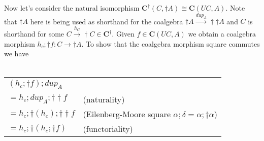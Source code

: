 \documentclass{article}
\newcommand{\mbf}{\mathbf}
\begin{document}
Now let's consider the natural isomorphism $\mbf{C}^\dagger(C,\dagger A) \cong \mbf{C}(UC,A)$. Note that
$\dagger A$ here is being used as shorthand for the coalgebra 
$\dagger A \overset{\mathit{dup}_A}{\longrightarrow} \dagger \dagger A$ and $C$ is shorthand for some $C \overset{h_C}{\longrightarrow} \dagger C \in \mathbf{C}^\dagger$. Given $f \in \mbf{C}(UC,A)$ we obtain a coalgebra morphism
$h_c;\dagger f : C \to \dagger A$. To show that the coalgebra morphism square commutes we have\\~\\
\begin{tabular}{ll}
$(h_c;\dagger f);\mathit{dup}_A$ & ~ \\
$= h_c;\mathit{dup}_A;\dagger \dagger f$ & (naturality)  \\
$= h_c;\dagger(h_c);\dagger \dagger f$ & (Eilenberg-Moore square $\alpha;\delta = \alpha;\dagger\alpha$) \\
$= h_c;\dagger(h_c;\dagger f)$ & (functoriality)
\end{tabular}
\end{document}
